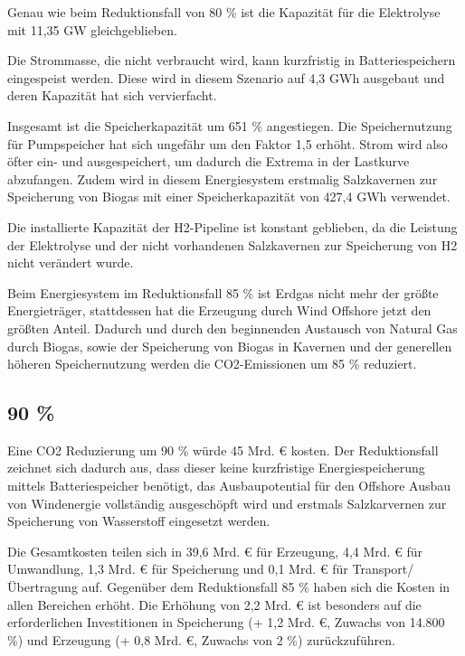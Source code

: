 Genau wie beim Reduktionsfall von 80 \% ist die Kapazität für die Elektrolyse mit 11,35 GW gleichgeblieben.

Die Strommasse, die nicht verbraucht wird, kann kurzfristig in Batteriespeichern eingespeist werden. Diese wird in diesem Szenario auf 4,3 GWh ausgebaut und deren Kapazität hat sich vervierfacht.

Insgesamt ist die Speicherkapazität um 651 \% angestiegen. Die Speichernutzung für Pumpspeicher hat sich ungefähr um den Faktor 1,5 erhöht. Strom wird also öfter ein- und ausgespeichert, um dadurch die Extrema in der Lastkurve abzufangen. Zudem wird in diesem Energiesystem erstmalig Salzkavernen zur Speicherung von Biogas mit einer Speicherkapazität von 427,4 GWh verwendet.

Die installierte Kapazität der H2-Pipeline ist konstant geblieben, da die Leistung der Elektrolyse und der nicht vorhandenen Salzkavernen zur Speicherung von H2 nicht verändert wurde.

Beim Energiesystem im Reduktionsfall 85 \% ist Erdgas nicht mehr der größte Energieträger, stattdessen hat die Erzeugung durch Wind Offshore jetzt den größten Anteil.
Dadurch und durch den beginnenden Austausch von Natural Gas durch Biogas, sowie der Speicherung von Biogas in Kavernen und der generellen höheren Speichernutzung werden die CO2-Emissionen um 85 \% reduziert.

\subsection{90 \%}
Eine CO2 Reduzierung um 90 \% würde 45 Mrd. € kosten. Der Reduktionsfall zeichnet sich dadurch aus, dass dieser keine kurzfristige Energiespeicherung mittels Batteriespeicher benötigt, das Ausbaupotential für den Offshore Ausbau von Windenergie vollständig ausgeschöpft wird und erstmals Salzkarvernen zur Speicherung von Wasserstoff eingesetzt werden.

Die Gesamtkosten teilen sich in 39,6 Mrd. € für Erzeugung, 4,4 Mrd. € für Umwandlung, 1,3 Mrd. € für Speicherung und 0,1 Mrd. € für Transport/Übertragung auf. Gegenüber dem Reduktionsfall 85 \% haben sich die Kosten in allen Bereichen erhöht. Die Erhöhung von 2,2 Mrd. € ist besonders auf die erforderlichen Investitionen in Speicherung (+ 1,2 Mrd. €, Zuwachs von 14.800 \%) und Erzeugung (+ 0,8 Mrd. €, Zuwachs von 2 \%) zurückzuführen.

